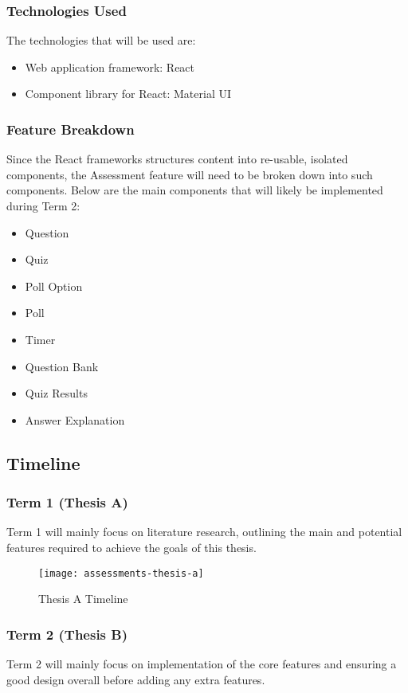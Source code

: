 \subsubsection{Technologies Used}
The technologies that will be used are:
\begin{itemize}
	\item Web application framework: React
	\item Component library for React: Material UI
\end{itemize}

\subsubsection{Feature Breakdown}
Since the React frameworks structures content into re-usable, isolated components, the Assessment feature will need to be broken down into such components. Below are the main components that will likely be implemented during Term 2:
\begin{itemize}
	\item Question
	\item Quiz
	\item Poll Option
	\item Poll
	\item Timer
	\item Question Bank
	\item Quiz Results
	\item Answer Explanation
\end{itemize}


\subsection{Timeline}
\subsubsection{Term 1 (Thesis A)}
Term 1 will mainly focus on literature research, outlining the main and potential features required to achieve the goals of this thesis.

\begin{figure}[!hbpt]
	\centering
	\texttt{[image: assessments-thesis-a]}
	\caption{Thesis A Timeline}
\end{figure}

\subsubsection{Term 2 (Thesis B)}
Term 2 will mainly focus on implementation of the core features and ensuring a good design overall before adding any extra features.

